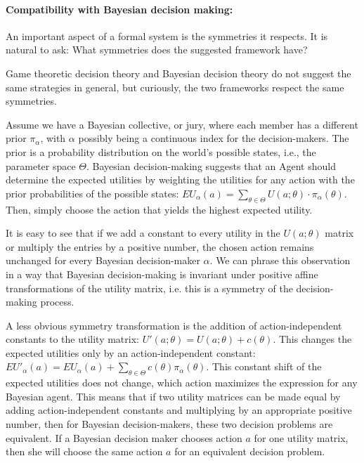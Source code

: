 \documentclass{article}
\begin{document}
\paragraph{Compatibility with Bayesian decision making:}
An important aspect of a formal system is the symmetries it respects.
It is natural to ask: What symmetries does the suggested framework have?

Game theoretic decision theory and Bayesian decision theory do not suggest the same strategies in general, but curiously, the two frameworks respect the same symmetries.

Assume we have a Bayesian collective, or jury, where each member has a different prior $\pi_\alpha$, with $\alpha$ possibly being a continuous index for the decision-makers.
The prior is a probability distribution on the world's possible states, i.e., the parameter space $\Theta$.
Bayesian decision-making suggests that an Agent should determine the expected utilities by weighting the utilities for any action with the prior probabilities of the possible states: $EU_\alpha(a) = \sum_{\theta \in \Theta} U(a;\theta) \cdot \pi_\alpha(\theta)$. Then, simply choose the action that yields the highest expected utility.

It is easy to see that if we add a constant to every utility in the $U(a;\theta)$ matrix or multiply the entries by a positive number, the chosen action remains unchanged for every Bayesian decision-maker $\alpha$.
We can phrase this observation in a way that Bayesian decision-making is invariant under positive affine transformations of the utility matrix, i.e. this is a symmetry of the decision-making process.

A less obvious symmetry transformation is the addition of action-independent constants to the utility matrix: $U'(a;\theta) = U(a;\theta) + c(\theta)$. This changes the expected utilities only by an action-independent constant: $EU'_\alpha(a)=EU_\alpha(a)+\sum_{\theta \in \Theta} c(\theta) \pi_\alpha(\theta)$.
This constant shift of the expected utilities does not change, which action maximizes the expression for any Bayesian agent.
This means that if two utility matrices can be made equal by adding action-independent constants and multiplying by an appropriate positive number, then for Bayesian decision-makers, these two decision problems are equivalent. If a Bayesian decision maker chooses action $a$ for one utility matrix, then she will choose the same action $a$ for an equivalent decision problem.
\end{document}
